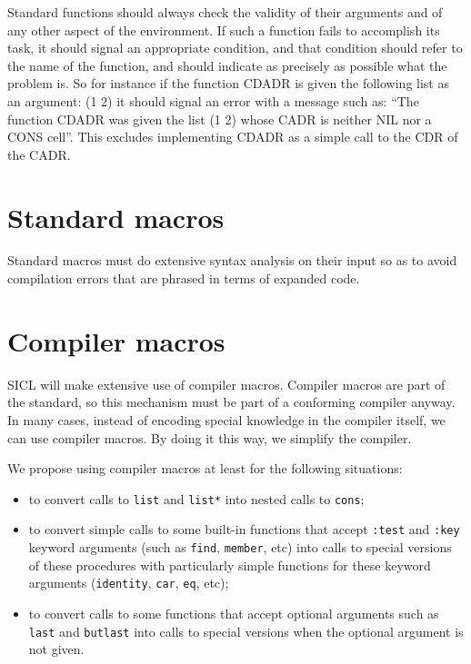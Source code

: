 \documentclass{article}
\def\sysname{SICL}
\begin{document}
Standard functions should always check the validity of their arguments
and of any other aspect of the environment.  If such a function fails
to accomplish its task, it should signal an appropriate condition, and
that condition should refer to the name of the function, and should
indicate as precisely as possible what the problem is.  So for
instance if the function CDADR is given the following list as an
argument: (1 2) it should signal an error with a message such as:
``The function CDADR was given the list (1 2) whose CADR is neither
NIL nor a CONS cell''.  This excludes implementing CDADR as a simple
call to the CDR of the CADR.

\section{Standard macros}

Standard macros must do extensive syntax analysis on their input so as
to avoid compilation errors that are phrased in terms of expanded
code.  

\section{Compiler macros}

{\sysname} will make extensive use of compiler macros.  Compiler
macros are part of the standard, so this mechanism must be part of a
conforming compiler anyway.  In many cases, instead of encoding
special knowledge in the compiler itself, we can use compiler macros.
By doing it this way, we simplify the compiler.

We propose using compiler macros at least for the following
situations: 

\begin{itemize}
\item to convert calls to \texttt{list} and \texttt{list*} into nested
  calls to \texttt{cons};
\item to convert simple calls to some built-in functions that accept
  \texttt{:test} and \texttt{:key} keyword arguments (such as
  \texttt{find}, \texttt{member}, etc) into calls to
  special versions of these procedures with particularly simple
  functions for these keyword arguments (\texttt{identity},
  \texttt{car}, \texttt{eq}, etc);
\item to convert calls to some functions that accept optional
  arguments such as \texttt{last} and \texttt{butlast} into calls to
  special versions when the optional argument is not given.
\end{itemize}
\end{document}
